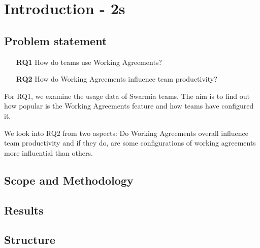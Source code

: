 
\chapter{Introduction - 2s}


\section{Problem statement}

\begin{enumerate}
    \item[{\bf RQ1}] How do teams use Working Agreements?
    \item[{\bf RQ2}] How do Working Agreements influence team productivity?
\end{enumerate}

For RQ1, we examine the usage data of Swarmia teams. The aim is to find out how popular is the Working Agreements feature and how teams have configured it. 

We look into RQ2 from two aspects: Do Working Agreements overall influence team productivity and if they do, are some configurations of working agreements more influential than others. 

\section{Scope and Methodology}

\section{Results}

\section{Structure}
